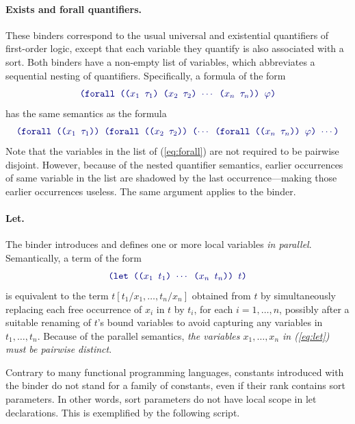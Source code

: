 \paragraph{Exists and forall quantifiers.}
These binders correspond 
to the usual universal and existential quantifiers of first-order logic,
except that each variable they quantify is also associated with a sort.
Both binders have a non-empty list of variables, 
which abbreviates a sequential nesting of quantifiers.
Specifically, a formula of the form
%
\begin{equation} \label{eq:forall}
\expr{
(forall (($x_1$ $\tau_1$) ($x_2$ $\tau_2$) $\cdots$ ($x_n$ $\tau_n$)) 
  $\varphi$)
}
\end{equation}
%
has the same semantics as the formula
%
\begin{equation} \label{eq:nested-forall}
\expr{
 (forall (($x_1$ $\tau_1$)) 
 (forall (($x_2$ $\tau_2$)) ($\cdots$ 
 (forall (($x_n$ $\tau_n$)) $\varphi$) $\cdots$)
}
\end{equation}
%
Note that the variables in the list 
of (\ref{eq:forall}) are not required to be pairwise disjoint.
However, because of the nested quantifier semantics, earlier occurrences 
of same variable in the list are shadowed by the last occurrence---making 
those earlier occurrences useless.
The same argument applies to the  binder.

\paragraph{Let.}
The  binder introduces and defines 
one or more local variables \emph{in parallel}.
Semantically, a term of the form
%
\begin{equation} \label{eq:let}
\expr{(let (($x_1$ $t_1$) $\cdots$ ($x_n$ $t_n$)) $t$)}
\end{equation}
%
is equivalent to the term $t[t_1/x_1, \ldots, t_n/x_n]$ obtained from $t$ 
by simultaneously replacing each free occurrence of $x_i$ in $t$ by $t_i$, 
for each $i=1,\ldots,n$,
possibly after a suitable renaming of $t$'s bound variables 
to avoid capturing any variables in $t_1, \ldots, t_n$.
Because of the parallel semantics, 
\emph{the variables $x_1, \ldots, x_n$ in (\ref{eq:let}) must be pairwise distinct}.


Contrary to many functional programming languages,
constants introduced with the  binder do not stand 
for a family of constants, even if their rank contains sort parameters.
In other words, sort parameters do not have local scope in let declarations.
%
This is exemplified by the following script.

